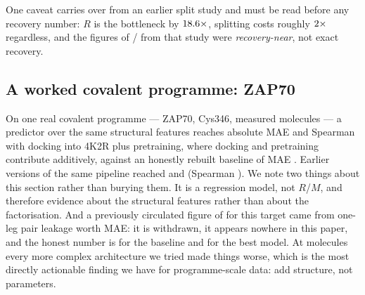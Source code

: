 One caveat carries over from an earlier split study and must be read before any recovery number:
$R$ is the bottleneck by $18.6\times$, splitting costs roughly $2\times$ regardless, and the
figures of / from that study were \emph{recovery-near}, not exact recovery.

\subsection{A worked covalent programme: ZAP70}
\label{sec:zap70}

On one real covalent programme --- ZAP70, Cys346,  measured molecules --- a predictor over the
same structural features reaches absolute MAE  and Spearman  with docking into
4K2R plus pretraining, where docking and pretraining contribute additively, against an honestly
rebuilt baseline of MAE . Earlier versions of the same pipeline reached  and
 (Spearman ). We note two things about this section rather than burying them. It
is a regression model, not $R$/$M$, and therefore evidence about the structural features rather than
about the factorisation. And a previously circulated figure of  for this target came from
one-leg pair leakage worth  MAE: it is withdrawn, it appears nowhere in this paper, and the
honest number is  for the baseline and  for the best model. At  molecules
every more complex architecture we tried made things worse, which is the most directly actionable
finding we have for programme-scale data: add structure, not parameters.
